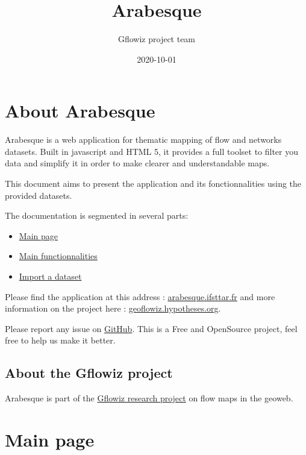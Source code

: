 \documentclass[]{book}
\title{Arabesque}
\author{Gflowiz project team}
\date{2020-10-01}
\providecommand{\tightlist}{%
  \setlength{\itemsep}{0pt}\setlength{\parskip}{0pt}}
\begin{document}
\maketitle

{
\setcounter{tocdepth}{1}
\tableofcontents
}
\hypertarget{about-arabesque}{%
\chapter*{About Arabesque}\label{about-arabesque}}

Arabesque is a web application for thematic mapping of flow and networks datasets.
Built in javascript and HTML 5, it provides a full toolset to filter you data
and simplify it in order to make clearer and understandable maps.

This document aims to present the application and its fonctionnalities using
the provided datasets.

The documentation is segmented in several parts:

\begin{itemize}
\tightlist
\item
  \href{./main-page.html}{Main page}
\item
  \href{./functionnalities.html}{Main functionnalities}
\item
  \href{./import-a-dataset.html}{Import a dataset}
\end{itemize}

Please find the application at this address : \href{http://arabesque.ifsttar.fr/}{arabesque.ifsttar.fr} and more information on the project here : \href{https://geoflowiz.hypotheses.org/}{geoflowiz.hypotheses.org}.

Please report any issue on \href{https://github.com/gflowiz/arabesque}{GitHub}. This is a Free and OpenSource project, feel free to help us make it better.

\hypertarget{about-the-gflowiz-project}{%
\section*{About the Gflowiz project}\label{about-the-gflowiz-project}}

Arabesque is part of the \href{https://geoflowiz.hypotheses.org/}{Gflowiz research project} on flow maps in the geoweb.

\hypertarget{main-page}{%
\chapter{Main page}\label{main-page}}
\end{document}
